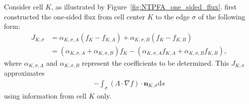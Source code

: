 \documentclass[11pt]{article}
\begin{document}
Consider cell $K$, as illustrated by Figure~\ref{fig:NTPFA_one_sided_flux}.  first constructed the one-sided flux from cell center $K$ to the edge $\sigma$ of the following form:
\begin{align}
    \label{J_K_sigma}
    J_{K,\sigma} &= \alpha_{K,\sigma, A}(f_K - f_{K,A}) + \alpha_{K,\sigma, B}(f_K - f_{K,B}) \\
                 &= (\alpha_{K,\sigma,A} + \alpha_{K,\sigma,B}) f_{K} - (\alpha_{K,\sigma,A} f_{K,A} + \alpha_{K,\sigma,B} f_{K,B}),
\end{align}
where $\alpha_{K,\sigma, A}$ and $\alpha_{K,\sigma, B}$ represent the coefficients to be determined. This $J_{K,\sigma}$ approximates 
\begin{align}
    -\int_{\sigma} (\Lambda \cdot \nabla f) \cdot \boldsymbol{n}_{K,\sigma}
    \mathrm{d} s
\end{align}
using information from cell $K$ only.
\end{document}
